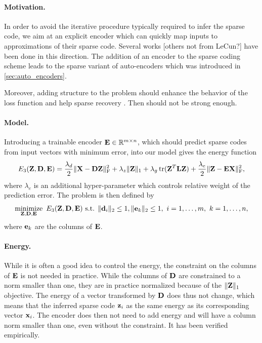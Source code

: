\paragraph{Motivation.}
In order to avoid the iterative procedure typically required to infer the sparse code, we aim at an explicit encoder which can quickly map inputs to approximations of their sparse code. Several works \cite{lecun2010PSD, lecun2010LISTA, lecun2013DrSAE} {\color{red} [others not from LeCun?]} have been done in this direction. The addition of an encoder to the sparse coding scheme leads to the sparse variant of auto-encoders which was introduced in \ref{sec:auto_encoders}.

Moreover, adding structure to the problem should enhance the behavior of the loss function and help sparse recovery \cite{kowalski2009sparse, baraniuk2010modelCS, huang2011LearningStructuredSparsity, jenatton2011structured}. {\color{red}Then \cite{donoho2003OptSparse} should not be strong enough.}

\paragraph{Model.}
Introducing a trainable encoder $\mathbf{E} \in \mathbb{R}^{m \times n}$, which should predict sparse codes from input vectors with minimum error, into our model gives the energy function
\begin{equation}\label{eqn:en_encoder}
	\Ethree = \frac{\lambda_d}{2} \normF{\X - \D \Z} + \lambda_z \normO{\Z} + \lambda_g \tr(\Z^T \L \Z) + \frac{\lambda_e}{2} \normF{\Z - \E \X}, %
\end{equation}
where $\lambda_e$ is an additional hyper-parameter which controls relative weight of the prediction error. The problem is then defined by
\begin{equation}\label{eqn:pr_encoder}
	\operatorname*{minimize}\limits_{\mathbf{Z},\mathbf{D},\mathbf{E}} \  E_3(\mathbf{Z}, \mathbf{D}, \mathbf{E}) \text{ s.t. } \|\mathbf{d}_i\|_2 \leq 1 , \|\mathbf{e}_k\|_2 \leq 1 ,
	\ i = 1, \ldots, m , \ k = 1, \ldots, n,
\end{equation}
where $\mathbf{e}_k$ are the columns of $\mathbf{E}$. %

\paragraph{Energy.}
While it is often a good idea to control the energy, the constraint on the columns of $\mathbf{E}$ is not needed in practice. While the columns of $\mathbf{D}$ are constrained to a norm smaller than one, they are in practice normalized because of the $\| \mathbf{Z} \|_1$ objective. The energy of a vector transformed by $\mathbf{D}$ does thus not change, which means that the inferred sparse code $\mathbf{z}_i$ as the same energy as its corresponding vector $\mathbf{x}_i$. The encoder does then not need to add energy and will have a column norm smaller than one, even without the constraint. It has been verified empirically.

